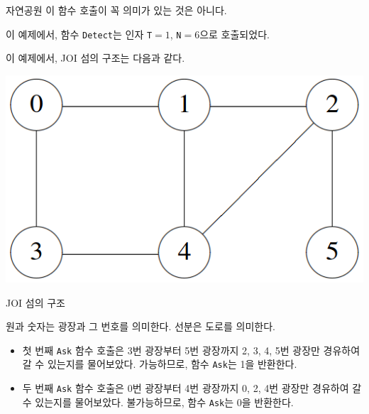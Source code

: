 \begin{problem}{자연공원}
	이 함수 호출이 꼭 의미가 있는 것은 아니다.
	
	이 예제에서, 함수 \texttt{Detect}는 인자 \texttt{T}$=1$, \texttt{N}$=6$으로 호출되었다.
	
	이 예제에서, JOI 섬의 구조는 다음과 같다.
	
	
	\begin{center}
	\includegraphics[width=0.3\linewidth]{pic1.png}
	
	JOI 섬의 구조
	\end{center}
	원과 숫자는 광장과 그 번호를 의미한다. 선분은 도로를 의미한다.
	
	\begin{itemize}
		\item 첫 번째 \texttt{Ask} 함수 호출은 3번 광장부터 5번 광장까지 2, 3, 4, 5번 광장만 경유하여 갈 수 있는지를 물어보았다. 가능하므로, 함수 \texttt{Ask}는 1을 반환한다.
		\item 두 번째 \texttt{Ask} 함수 호출은 0번 광장부터 4번 광장까지 0, 2, 4번 광장만 경유하여 갈 수 있는지를 물어보았다. 불가능하므로, 함수 \texttt{Ask}는 0을 반환한다.
	\end{itemize}
	
\end{problem}

